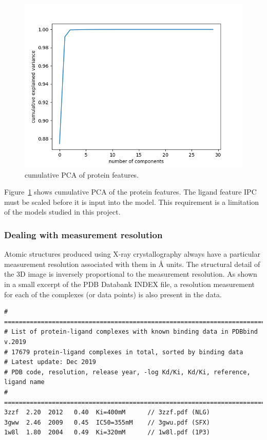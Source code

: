 \documentclass[11pt]{article}
\begin{document}
\begin{figure}[htb]
  \centering
    \includegraphics[scale=0.7]{images/pcaproteinanalysis}
    \caption{cumulative PCA of protein features.}
    \label{fig:pcaproteinanalysis}
\end{figure}

Figure~\ref{fig:pcaproteinanalysis} shows cumulative PCA of the protein features. The ligand feature IPC must be scaled before it is input into the model. This requirement is a limitation of the models studied in this project.

\subsubsection{Dealing with measurement resolution}
Atomic structures produced using X-ray crystallography always have a particular measurement resolution associated with them in \si{\angstrom} units. The structural detail of the 3D image is inversely proportional to the measurement resolution.
As shown in a small excerpt of the PDB Databank INDEX file, a resolution measurement for each of the complexes (or data points) is also present in the data.


\begin{verbatim}
# ==============================================================================
# List of protein-ligand complexes with known binding data in PDBbind v.2019
# 17679 protein-ligand complexes in total, sorted by binding data
# Latest update: Dec 2019
# PDB code, resolution, release year, -log Kd/Ki, Kd/Ki, reference, ligand name
# ==============================================================================
3zzf  2.20  2012   0.40  Ki=400mM      // 3zzf.pdf (NLG)
3gww  2.46  2009   0.45  IC50=355mM    // 3gwu.pdf (SFX)
1w8l  1.80  2004   0.49  Ki=320mM      // 1w8l.pdf (1P3)
\end{verbatim}
\end{document}
